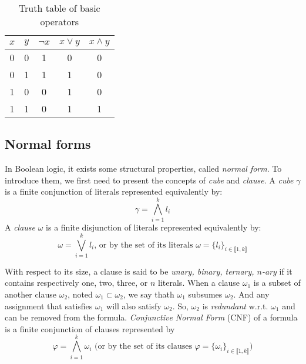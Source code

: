 \begin{table}[!htbp]
 \centering
 \begin{tabular}{cc|ccc}
  $x$ & $y$ & $\neg x$ & $x \lor y$ & $x \land y$ \\
  \toprule
  0 & 0 & 1 & 0 & 0 \\
  \midrule
  0 & 1 & 1 & 1 & 0 \\
  \midrule
  1 & 0 & 0 & 1 & 0 \\
  \midrule
  1 & 1 & 0 & 1 & 1 \\
  \bottomrule
 \end{tabular}
 \caption{Truth table of basic operators}
 \label{tab:truthtable}
\end{table}
\subsection{Normal forms}
In Boolean logic, it exists some structural properties, called \emph{normal form}.
To introduce them, we first need to present the concepts of \emph{cube} and \emph{clause}.
A \emph{cube} $\gamma$ is a finite conjunction of literals represented equivalently by:
$$\gamma = \bigwedge_{i=1}^k l_i $$
A \emph{clause} $\omega$ is a finite disjunction of literals represented equivalently by:
$$\omega = \bigvee_{i=1}^k l_i \text{, or by the set of its literals } \omega = \{l_i\}_{i \in \llbracket 1,k \rrbracket}$$
 
With respect to its size, a clause is said to be \emph{unary, binary, ternary, $n$-ary} if it contains respectively one, two, three, or $n$ literals.
When a clause $\omega_1$ is a subset of another clause $\omega_2$, noted $\omega_1 \subset \omega_2$,
we say thath $\omega_{1}$ subsumes $\omega_{2}$.
 And any assignment that satisfies $\omega_1$ will also satisfy $\omega_2$. So, $\omega_2$ is \emph{redundant} w.r.t. $\omega_1$ and can be removed from the formula.
\emph{Conjunctive Normal Form} (CNF) of a formula is a finite conjunction of clauses represented by
  $$\varphi = \bigwedge_{i=1}^k \omega_i \text{ (or by the set of its clauses } \varphi = \{\omega_i\}_{i \in \llbracket 1,k \rrbracket}\text{)}$$
  
